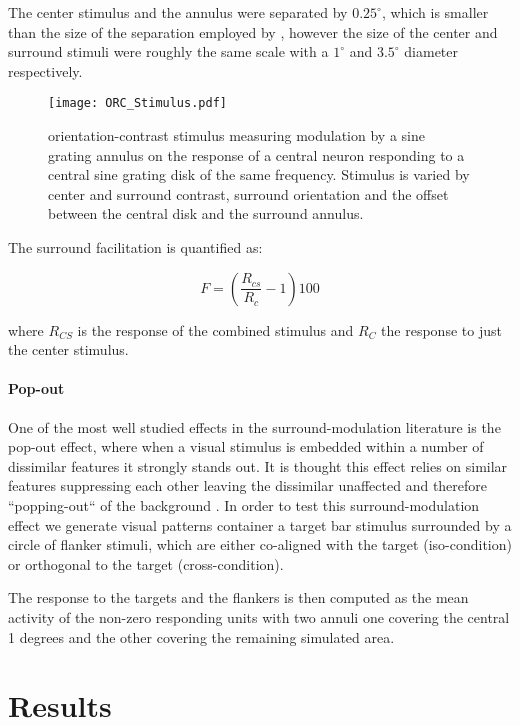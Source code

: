 The center stimulus and the annulus were separated by $0.25^\circ$,
which is smaller than the size of the separation employed by
\cite{Jones2002}, however the size of the center and surround stimuli
were roughly the same scale with a $1^\circ$ and $3.5^\circ$ diameter
respectively.

\begin{figure}
	\centering
        \texttt{[image: ORC\_Stimulus.pdf]}
	\caption{orientation-contrast stimulus measuring modulation by a
      sine grating annulus on the response of a central neuron
      responding to a central sine grating disk of the same frequency.
      Stimulus is varied by center and surround contrast, surround
      orientation and the offset between the central disk and the
      surround annulus.}
	\label{ORC_Stimulus}
\end{figure}

The surround facilitation is quantified as:

\begin{equation}
F = (\frac{R_{cs}}{R_c} - 1) 100
\end{equation}

where $R_{CS}$ is the response of the combined stimulus and $R_C$ the
response to just the center stimulus.

\paragraph{Pop-out}

One of the most well studied effects in the surround-modulation
literature is the pop-out effect, where when a visual stimulus is
embedded within a number of dissimilar features it strongly stands
out. It is thought this effect relies on similar features suppressing
each other leaving the dissimilar unaffected and therefore
``popping-out`` of the background \citep{Kastner1997}. In order to
test this surround-modulation effect we generate visual patterns
container a target bar stimulus surrounded by a circle of flanker
stimuli, which are either co-aligned with the target (iso-condition)
or orthogonal to the target (cross-condition).

The response to the targets and the flankers is then computed as the
mean activity of the non-zero responding units with two annuli one
covering the central 1 degrees and the other covering the remaining
simulated area.

\section{Results}

